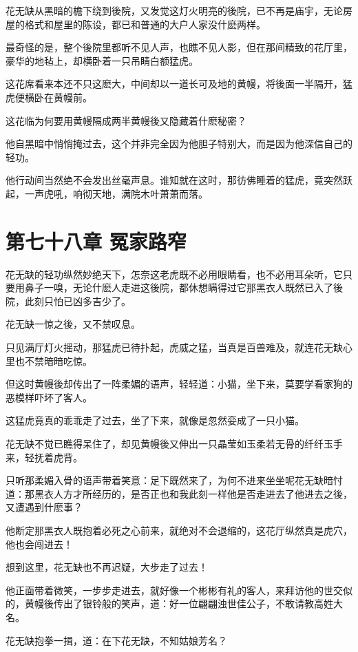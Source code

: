 \documentclass[12pt,oneside]{book}
\begin{document}
花无缺从黑暗的檐下绕到後院，又发觉这灯火明亮的後院，已不再是庙宇，无论房屋的格式和屋里的陈设，都已和普通的大户人家没什麽两样。

最奇怪的是，整个後院里都听不见人声，也瞧不见人影，但在那间精致的花厅里，豪华的地毡上，却横卧着一只吊睛白额猛虎。

这花席看来本还不只这麽大，中间却以一道长可及地的黄幔，将後面一半隔开，猛虎便横卧在黄幔前。

这花临为何要用黄幔隔成两半黄幔後又隐藏着什麽秘密？

他自黑暗中悄悄掩过去，这个并非完全因为他胆子特别大，而是因为他深信自己的轻功。

他行动间当然绝不会发出丝毫声息。谁知就在这时，那彷佛睡着的猛虎，竟突然跃起，一声虎吼，响彻天地，满院木叶萧萧而落。

\hypertarget{ux7b2cux4e03ux5341ux516bux7ae0-ux51a4ux5bb6ux8defux7a84}{%
\chapter{第七十八章
冤家路窄}\label{ux7b2cux4e03ux5341ux516bux7ae0-ux51a4ux5bb6ux8defux7a84}}

花无缺的轻功纵然妙绝天下，怎奈这老虎既不必用眼睛看，也不必用耳朵听，它只要用鼻子一嗅，无论什麽人走进这後院，都休想瞒得过它那黑衣人既然已入了後院，此刻只怕已凶多吉少了。

花无缺一惊之後，又不禁叹息。

只见满厅灯火摇动，那猛虎已待扑起，虎威之猛，当真是百兽难及，就连花无缺心里也不禁暗暗吃惊。

但这时黄幔後却传出了一阵柔媚的语声，轻轻道：小猫，坐下来，莫要学看家狗的恶模样吓坏了客人。

这猛虎竟真的乖乖走了过去，坐了下来，就像是忽然娈成了一只小猫。

花无缺不觉已瞧得呆住了，却见黄幔後又伸出一只晶莹如玉柔若无骨的纤纤玉手来，轻抚着虎背。

只听那柔媚入骨的语声带着笑意：足下既然来了，为何不进来坐坐呢花无缺暗忖道：那黑衣人方才所经历的，是否正也和我此刻一样他是否走进去了他进去之後，又遭遇到什麽事？

他断定那黑衣人既抱着必死之心前来，就绝对不会退缩的，这花厅纵然真是虎穴，他也会闯进去！

想到这里，花无缺也不再迟疑，大步走了过去！

他正面带着微笑，一步步走进去，就好像一个彬彬有礼的客人，来拜访他的世交似的，黄幔後传出了银铃般的笑声，道：好一位翩翩浊世佳公子，不敢请教高姓大名。

花无缺抱拳一揖，道：在下花无缺，不知姑娘芳名？
\end{document}
